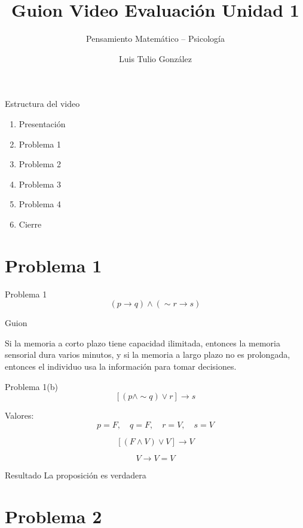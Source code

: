 \documentclass[aspectratio=169,10pt]{beamer}
\title{Guion Video Evaluación Unidad 1}
\subtitle{Pensamiento Matemático -- Psicología}
\author{Luis Tulio González}
\date{}
\newcommand{\guion}[1]{
	\begin{block}{Guion}
		#1
	\end{block}
}
\newcommand{\resultado}[1]{
	\begin{alertblock}{Resultado}
		#1
	\end{alertblock}
}
\begin{document}
	
	\begin{frame}
		\titlepage
	\end{frame}
	
	\begin{frame}{Estructura del video}
		\begin{enumerate}
			\item Presentación
			\item Problema 1
			\item Problema 2
			\item Problema 3
			\item Problema 4
			\item Cierre
		\end{enumerate}
	\end{frame}
	
	\section{Problema 1}
	
	\begin{frame}{Problema 1}
		\[
		(p \to q)\land(\sim r \to s)
		\]
		
		\guion{
			Si la memoria a corto plazo tiene capacidad ilimitada, entonces la memoria sensorial dura varios minutos, y si la memoria a largo plazo no es prolongada, entonces el individuo usa la información para tomar decisiones.
		}
	\end{frame}
	
	\begin{frame}{Problema 1(b)}
		\[
		[(p\land \sim q)\lor r]\to s
		\]
		
		Valores:
		\[
		p=F,\quad q=F,\quad r=V,\quad s=V
		\]
		
		\[
		[(F\land V)\lor V]\to V
		\]
		
		\[
		V \to V = V
		\]
		
		\resultado{La proposición es verdadera}
	\end{frame}
	
	\section{Problema 2}
	
\end{document}
